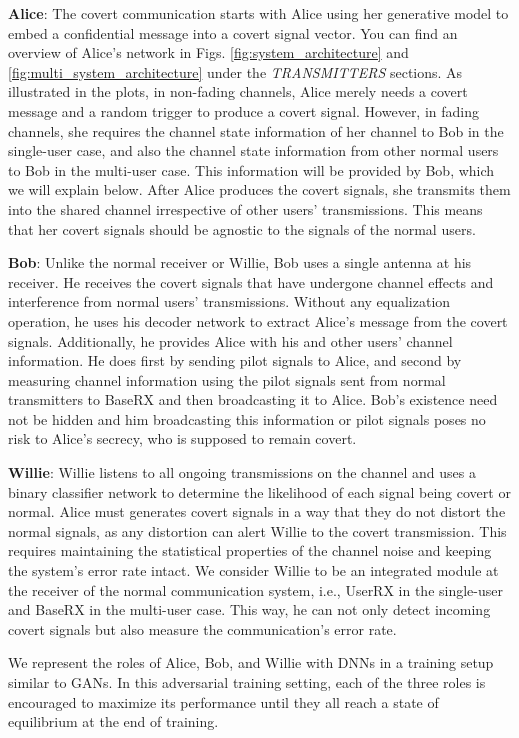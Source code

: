 \textbf{Alice}: The covert communication starts with Alice using her generative model to embed a confidential message into a covert signal vector. You can find an overview of Alice's network in Figs. \ref{fig:system_architecture} and \ref{fig:multi_system_architecture} under the \textit{TRANSMITTERS} sections. As illustrated in the plots, in non-fading channels, Alice merely needs a covert message and a random trigger to produce a covert signal. However, in fading channels, she requires the channel state information of her channel to Bob in the single-user case, and also the channel state information from other normal users to Bob in the multi-user case. This information will be provided by Bob, which we will explain below. After Alice produces the covert signals, she transmits them into the shared channel irrespective of other users' transmissions. This means that her covert signals should be agnostic to the signals of the normal users.

\textbf{Bob}: Unlike the normal receiver or Willie, Bob uses a single antenna at his receiver. He receives the covert signals that have undergone channel effects and interference from normal users' transmissions. Without any equalization operation, he uses his decoder network to extract Alice's message from the covert signals. Additionally, he provides Alice with his and other users' channel information. He does first by sending pilot signals to Alice, and second by measuring channel information using the pilot signals sent from normal transmitters to BaseRX and then broadcasting it to Alice. Bob's existence need not be hidden and him broadcasting this information or pilot signals poses no risk to Alice's secrecy, who is supposed to remain covert.

\textbf{Willie}: Willie listens to all ongoing transmissions on the channel and uses a binary classifier network to determine the likelihood of each signal being covert or normal. Alice must generates covert signals in a way that they do not distort the normal signals, as any distortion can alert Willie to the covert transmission. This requires maintaining the statistical properties of the channel noise and keeping the system's error rate intact. We consider Willie to be an integrated module at the receiver of the normal communication system, i.e., UserRX in the single-user and BaseRX in the multi-user case. This way, he can not only detect incoming covert signals but also measure the communication's error rate.

We represent the roles of Alice, Bob, and Willie with DNNs in a training setup similar to GANs. In this adversarial training setting, each of the three roles is encouraged to maximize its performance until they all reach a state of equilibrium at the end of training.

